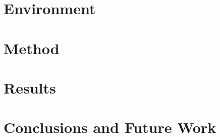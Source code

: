 \documentclass[12pt]{scrreprt}
\begin{document}
\chapter{Environment}


\chapter{Method}


\chapter{Results}


\chapter{Conclusions and Future Work}


\listoffigures
\printbibliography
\end{document}
